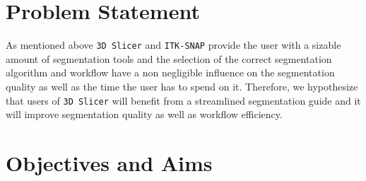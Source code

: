 \section{Problem Statement}
\begin{body}
	As mentioned above \texttt{3D Slicer} and \texttt{ITK-SNAP} provide the user with a sizable amount of segmentation tools and the selection of the correct segmentation algorithm and workflow have a non negligible influence on the segmentation quality as well as the time the user has to spend on it.
	Therefore, we hypothesize that users of \texttt{3D Slicer} will benefit from a streamlined segmentation guide and it will improve segmentation quality as well as workflow efficiency.

\end{body}

\clearpage
\section{Objectives and Aims}
\begin{body}
	\lipsum[2-3]

\end{body}
\clearpage
